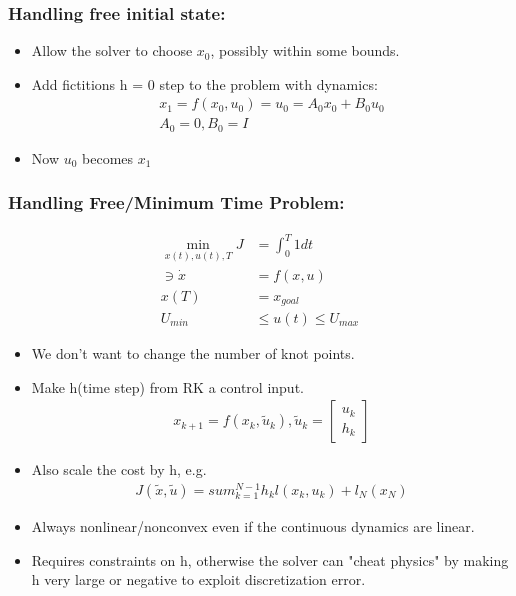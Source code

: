 \subsubsection{Handling free initial state:}
\begin{itemize}
    \item Allow the solver to choose $x_0$, possibly within some bounds.
    \item Add fictitions h = 0 step to the problem with dynamics:
    \begin{align}
        x_1 = f(x_0, u_0) = u_0 = A_0 x_0 + B_0 u_0 \\
        A_0 = 0, B_0 = I 
    \end{align}
    \item Now $u_0$ becomes $x_1$
\end{itemize}

\subsubsection{Handling Free/Minimum Time Problem:}
\begin{align}
    \min_{x(t), u(t), T} J & = \int_0^T 1 dt \\
    \ni \dot x & = f(x, u) \\
    x(T) & = x_{goal} \\
    U_{min} &\leq u(t) \leq U_{max}
\end{align}
\begin{itemize}
    \item We don't want to change the number of knot points.
    \item Make h(time step) from RK a control input.
    \begin{align}
        x_{k+1} = f(x_k, \tilde u_k), \tilde u_k = \begin{bmatrix}
            u_k \\ h_k
        \end{bmatrix}
    \end{align}
    \item Also scale the cost by h, e.g.
    \begin{align}
        J(\tilde x, \tilde u) = sum_{k=1}^{N-1} h_k l(x_k, u_k) + l_N(x_N)
    \end{align}
    \item Always nonlinear/nonconvex even if the continuous dynamics are linear.
    \item Requires constraints on h, otherwise the solver can "cheat physics" by making h very large or negative to exploit discretization error.
\end{itemize}


